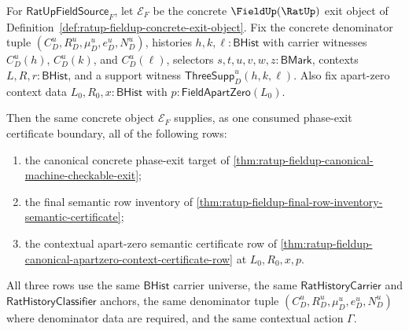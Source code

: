\begin{theorem}
\label{thm:ratup-fieldup-phase-exit-certificate-consumption}
For $\mathsf{RatUpFieldSource}_F$, let $\mathcal E_F$ be the concrete
$\FieldUp(\RatUp)$ exit object of
Definition~\ref{def:ratup-fieldup-concrete-exit-object}. Fix the concrete
denominator tuple $(C_D^u,R_D^u,\mu_D^u,e_D^u,N_D^u)$, histories
$h,k,\ell:\mathsf{BHist}$ with carrier witnesses $C_D^u(h)$, $C_D^u(k)$, and
$C_D^u(\ell)$, selectors $s,t,u,v,w,z:\mathsf{BMark}$, contexts
$L,R,r:\mathsf{BHist}$, and a support witness
$\mathsf{ThreeSupp}_D^u(h,k,\ell)$. Also fix apart-zero context data
$L_0,R_0,x:\mathsf{BHist}$ with $p:\mathsf{FieldApartZero}(L_0)$.

Then the same concrete object $\mathcal E_F$ supplies, as one consumed
phase-exit certificate boundary, all of the following rows:
\begin{enumerate}
  \item the canonical concrete phase-exit target of
  \autoref{thm:ratup-fieldup-canonical-machine-checkable-exit};
  \item the final semantic row inventory of
  \autoref{thm:ratup-fieldup-final-row-inventory-semantic-certificate};
  \item the contextual apart-zero semantic certificate row of
  \autoref{thm:ratup-fieldup-canonical-apartzero-context-certificate-row} at
  $L_0,R_0,x,p$.
\end{enumerate}
All three rows use the same $\mathsf{BHist}$ carrier universe, the same
$\mathsf{RatHistoryCarrier}$ and $\mathsf{RatHistoryClassifier}$ anchors, the
same denominator tuple $(C_D^u,R_D^u,\mu_D^u,e_D^u,N_D^u)$ where denominator
data are required, and the same contextual action $\Gamma$.
\end{theorem}
